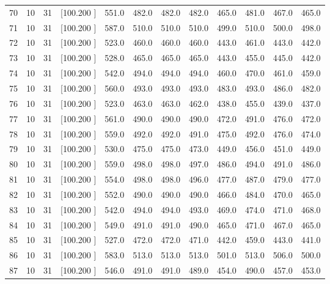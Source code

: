 \documentclass[12pt,a4paper]{article}
\begin{document}
\begin{center}
{\begin{tabular}{r r r r r r r r r r r r}
  70& 10& 31&[100.200   ]&   551.0&   482.0&   482.0&   482.0&   465.0&   481.0&   467.0&   465.0\\[-0.02in]
  71& 10& 31&[100.200   ]&   587.0&   510.0&   510.0&   510.0&   499.0&   510.0&   500.0&   498.0\\[-0.02in]
  72& 10& 31&[100.200   ]&   523.0&   460.0&   460.0&   460.0&   443.0&   461.0&   443.0&   442.0\\[-0.02in]
  73& 10& 31&[100.200   ]&   528.0&   465.0&   465.0&   465.0&   443.0&   455.0&   445.0&   442.0\\[-0.02in]
  74& 10& 31&[100.200   ]&   542.0&   494.0&   494.0&   494.0&   460.0&   470.0&   461.0&   459.0\\[-0.02in]
  75& 10& 31&[100.200   ]&   560.0&   493.0&   493.0&   493.0&   483.0&   493.0&   486.0&   482.0\\[-0.02in]
  76& 10& 31&[100.200   ]&   523.0&   463.0&   463.0&   462.0&   438.0&   455.0&   439.0&   437.0\\[-0.02in]
  77& 10& 31&[100.200   ]&   561.0&   490.0&   490.0&   490.0&   472.0&   491.0&   476.0&   472.0\\[-0.02in]
  78& 10& 31&[100.200   ]&   559.0&   492.0&   492.0&   491.0&   475.0&   492.0&   476.0&   474.0\\[-0.02in]
  79& 10& 31&[100.200   ]&   530.0&   475.0&   475.0&   473.0&   449.0&   456.0&   451.0&   449.0\\[-0.02in]
  80& 10& 31&[100.200   ]&   559.0&   498.0&   498.0&   497.0&   486.0&   494.0&   491.0&   486.0\\[-0.02in]
  81& 10& 31&[100.200   ]&   554.0&   498.0&   498.0&   496.0&   477.0&   487.0&   479.0&   477.0\\[-0.02in]
  82& 10& 31&[100.200   ]&   552.0&   490.0&   490.0&   490.0&   466.0&   484.0&   470.0&   465.0\\[-0.02in]
  83& 10& 31&[100.200   ]&   542.0&   494.0&   494.0&   493.0&   469.0&   474.0&   471.0&   468.0\\[-0.02in]
  84& 10& 31&[100.200   ]&   549.0&   491.0&   491.0&   490.0&   465.0&   471.0&   467.0&   465.0\\[-0.02in]
  85& 10& 31&[100.200   ]&   527.0&   472.0&   472.0&   471.0&   442.0&   459.0&   443.0&   441.0\\[-0.02in]
  86& 10& 31&[100.200   ]&   583.0&   513.0&   513.0&   513.0&   501.0&   513.0&   506.0&   500.0\\[-0.02in]
  87& 10& 31&[100.200   ]&   546.0&   491.0&   491.0&   489.0&   454.0&   490.0&   457.0&   453.0\\[-0.02in]

\end{tabular}}
\end{center}
\end{document}
